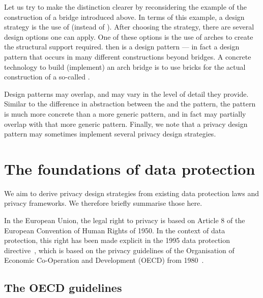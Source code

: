 Let us try to make the distinction clearer by reconsidering the example of the construction of a bridge introduced above. In terms of this example, a design strategy is the use of  (instead of ). After choosing the  strategy, there are several design options one can apply. One of these options is the use of arches to create the structural support required.  then is a design pattern --- in fact a design pattern that occurs in many different constructions beyond bridges. A concrete technology to build (\ie implement) an arch bridge is to use bricks for the actual construction of a so-called .


Design patterns may overlap, and may vary in the level of detail they provide. Similar to the difference in abstraction between the  and the  pattern, the  pattern is much more concrete than a more generic  pattern, and in fact may partially overlap with that more generic pattern. Finally, we note that a privacy design pattern may sometimes implement several privacy design strategies.






\section{The foundations of data protection}
\label{sec-legal}

We aim to derive privacy design strategies from existing data protection laws and privacy frameworks. We therefore briefly summarise those here.

In the European Union, the legal right to privacy is based on Article 8 of the European Convention of Human Rights of 1950. In the context of data protection, this right has been made explicit in the 1995 data protection directive~\cite{ec-95-46}, which is based on the privacy guidelines of the Organisation of Economic Co-Operation and Development (OECD) from 1980~\cite{oecd1980guidelines}. 

\subsection{The OECD guidelines}

